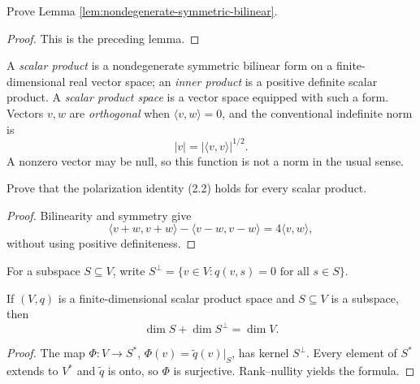 \begin{exercise}
\label{exer:prove-nondegenerate-equivalent}
\leanok
{}
Prove Lemma \ref{lem:nondegenerate-symmetric-bilinear}.
\end{exercise}

\begin{proof}
\leanok
\sketch This is the preceding lemma.
\end{proof}

A \emph{scalar product} is a nondegenerate symmetric bilinear form on a
finite-dimensional real vector space; an \emph{inner product} is a positive
definite scalar product. A \emph{scalar product space} is a vector space equipped
with such a form. Vectors $v,w$ are \emph{orthogonal} when
$\langle v,w\rangle=0$, and the conventional indefinite norm is
\[
|v|=|\langle v,v\rangle|^{1/2}.
\]
A nonzero vector may be null, so this function is not a norm in the usual sense.

\begin{exercise}
\label{exer:polarization-scalar-product}
\leanok
{}
Prove that the polarization identity (2.2) holds for every scalar product.
\end{exercise}

\begin{proof}
\leanok
\sketch Bilinearity and symmetry give
\[
\langle v+w,v+w\rangle-\langle v-w,v-w\rangle=4\langle v,w\rangle,
\]
without using positive definiteness.
\end{proof}

For a subspace $S\subseteq V$, write
$S^\perp=\{v\in V:q(v,s)=0\text{ for all }s\in S\}$.

\begin{lemma}
\label{lem:orthogonal-complement}
\leanok
{}
If $(V,q)$ is a finite-dimensional scalar product space and $S\subseteq V$ is a
subspace, then
\[
\dim S+\dim S^\perp=\dim V.
\]
\end{lemma}

\begin{proof}
\leanok
\sketch The map
$\Phi\colon V\to S^*$, $\Phi(v)=\widetilde q(v)|_S$, has kernel $S^\perp$.
Every element of $S^*$ extends to $V^*$ and $\widetilde q$ is onto, so $\Phi$ is
surjective. Rank--nullity yields the formula.
\end{proof}

